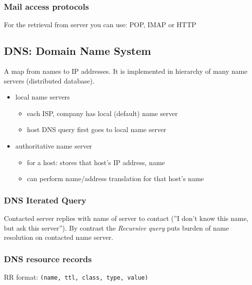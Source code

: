 \documentclass[10pt, a4paper, twocolumn]{scrartcl}
\begin{document}
\subsubsection{Mail access protocols}

For the retrieval from server you can use: POP, IMAP or HTTP

\subsection{DNS: Domain Name System}

A map from names to IP addresses. It is implemented in hierarchy of many name servers (distributed database).

\begin{itemize}
	\item local name servers
		\begin{itemize}
			\item each ISP, company has local (default) name server
			\item host DNS query first goes to local name server
		\end{itemize}
	\item authoritative name server
		\begin{itemize}
			\item for a host: stores that host's IP address, name
			\item can perform name/address translation for that host's name
		\end{itemize}
\end{itemize}

\subsubsection{DNS Iterated Query}

Contacted server replies with name of server to contact (''I don't know this name, but ask this server''). By contrast the \textit{Recursive query} puts burden of name resolution on contacted name server.

\subsubsection{DNS resource records}

RR format: \verb#(name, ttl, class, type, value)#
\end{document}

